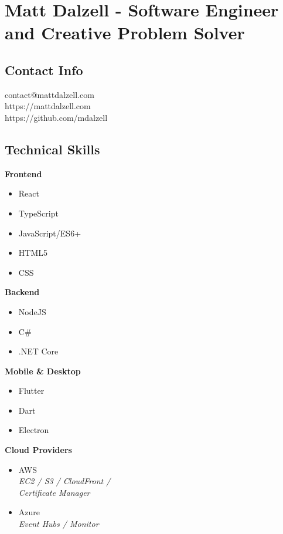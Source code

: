\documentclass[10pt]{article}
\begin{document}

\section*{Matt Dalzell - {\large Software Engineer and Creative Problem Solver}}

\setlength{\columnsep}{4em}
\setlength{\columnseprule}{0.1pt}
\begin{paracol}{2}

    \subsection*{Contact Info}
    contact@mattdalzell.com \\
    https://mattdalzell.com \\
    https://github.com/mdalzell

    \subsection*{Technical Skills}

    \textbf{Frontend}
    \begin{itemize}
        \item React
        \item TypeScript
        \item JavaScript/ES6+
        \item HTML5
        \item CSS
    \end{itemize}

    \noindent \textbf{Backend}
    \begin{itemize}
        \item NodeJS
        \item C\#
        \item .NET Core
    \end{itemize}

    \noindent \textbf{Mobile \& Desktop}
    \begin{itemize}
        \item Flutter
        \item Dart
        \item Electron
    \end{itemize}

    \noindent \textbf{Cloud Providers}
    \begin{itemize}
        \item AWS  \\ {\footnotesize{\textit{EC2 / S3 / CloudFront / \\ Certificate Manager}}}
        \item Azure \\ {\footnotesize{\textit{Event Hubs / Monitor}}}
    \end{itemize}


\end{paracol}
\end{document}
